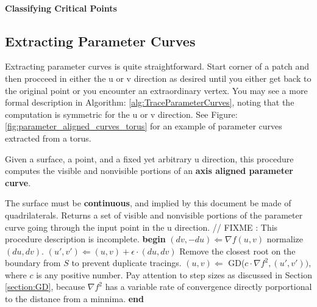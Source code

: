 \documentclass[12pt, letterpaper]{article}
\begin{document}
		\paragraph{Classifying Critical Points}


	\subsection{Extracting Parameter Curves}

		Extracting parameter curves is quite straightforward. Start corner of a patch and then procceed in either the u or v direction as desired until you either get back to the original point or you encounter an extraordinary vertex.
		You may see a more formal description in Algorithm: \ref{alg:TraceParameterCurves}, noting that the computation is symmetric for the u or v direction.
		See Figure: \ref{fig:parameter_aligned_curves_torus} for an example of parameter curves extracted from a torus.

		\begin{algorithm}                      %
		\caption{Given a surface, a point, and a fixed yet arbitrary u direction, this procedure computes the visible and nonvisible portions of an \textbf{axis aligned parameter curve}.}
		\label{alg:TraceParameterCurves}       %
		\begin{algorithmic}                    %
			\REQUIRE The surface must be \textbf{continuous}, and implied by this document be made of quadrilaterals.
			\ENSURE Returns a set of visible and nonvisible portions of the parameter curve going through the input point in the u direction.
// FIXME : This procedure description is incomplete.
			\STATE \textbf{begin}
			\REPEAT
			        \STATE $(dv, -du) \Leftarrow \nabla f(u,v)$
				\STATE normalize $(du, dv)$.
				\STATE $(u', v') \Leftarrow (u, v) + \epsilon \cdot (du, dv)$
					\STATE Remove the closest root on the boundary from $S$ to prevent duplicate tracings.
				\ENDIF
				\STATE $(u, v) \Leftarrow$ GD($c \cdot \nabla f^{2}, (u',v'))$, where $c$ is any positive number. Pay attention to step sizes as discussed in Section \ref{section:GD}, because $\nabla f^{2}$ has a variable rate of convergence directly porportional to the distance from a minnima.
			 
			\STATE \textbf{end}
		\end{algorithmic}
		\end{algorithm}
\end{document}
